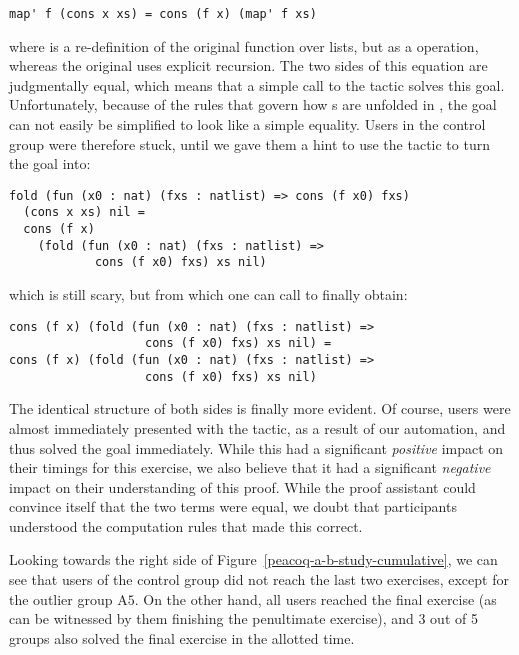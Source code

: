 \begin{verbatim}
map' f (cons x xs) = cons (f x) (map' f xs)
\end{verbatim}

\noindent where  is a re-definition of the original function
 over lists, but as a  operation, whereas the
original uses explicit recursion.  The two sides of this equation are
judgmentally equal, which means that a simple call to the
 tactic solves this goal.  Unfortunately, because of the
rules that govern how s are unfolded in \Coq{}, the goal can
not easily be simplified to look like a simple equality.  Users in the control
group were therefore stuck, until we gave them a hint to use the
 tactic to turn the goal into:

\begin{verbatim}
fold (fun (x0 : nat) (fxs : natlist) => cons (f x0) fxs)
  (cons x xs) nil =
  cons (f x)
    (fold (fun (x0 : nat) (fxs : natlist) =>
            cons (f x0) fxs) xs nil)
\end{verbatim}

\noindent which is still scary, but from which one can call 
to finally obtain:

\begin{verbatim}
cons (f x) (fold (fun (x0 : nat) (fxs : natlist) =>
                   cons (f x0) fxs) xs nil) =
cons (f x) (fold (fun (x0 : nat) (fxs : natlist) =>
                   cons (f x0) fxs) xs nil)
\end{verbatim}

\noindent The identical structure of both sides is finally more evident.  Of
course, \PeaCoq{} users were almost immediately presented with the
 tactic, as a result of our automation, and thus solved
the goal immediately.  While this had a significant \emph{positive} impact on
their timings for this exercise, we also believe that it had a significant
\emph{negative} impact on their understanding of this proof.  While the proof
assistant could convince itself that the two terms were equal, we doubt that
participants understood the computation rules that made this correct.

Looking towards the right side of Figure~\ref{peacoq-a-b-study-cumulative}, we
can see that users of the control group did not reach the last two exercises,
except for the outlier group $\text{A}5$.  On the other hand, all \PeaCoq{}
users reached the final exercise (as can be witnessed by them finishing the
penultimate exercise), and 3 out of 5 groups also solved the final exercise
in the allotted time.

